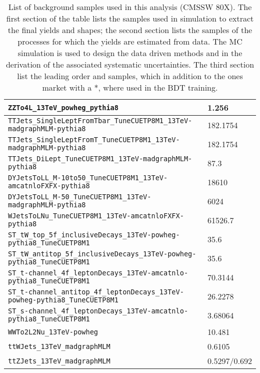 \begin{table}
\begin{tabular}{ll}
    \verb|ZZTo4L_13TeV_powheg_pythia8|                                              & 1.256 \\ \hline
    \verb|TTJets_SingleLeptFromTbar_TuneCUETP8M1_13TeV-madgraphMLM-pythia8|         & 182.1754 \quad * \\
    \verb|TTJets_SingleLeptFromT_TuneCUETP8M1_13TeV-madgraphMLM-pythia8|            & 182.1754 \quad * \\
    \verb|TTJets_DiLept_TuneCUETP8M1_13TeV-madgraphMLM-pythia8|                     & 87.3 \quad\quad\quad * \\
    \verb|DYJetsToLL_M-10to50_TuneCUETP8M1_13TeV-amcatnloFXFX-pythia8|              & 18610 \\
    \verb|DYJetsToLL_M-50_TuneCUETP8M1_13TeV-madgraphMLM-pythia8|                   & 6024 \\
    \verb|WJetsToLNu_TuneCUETP8M1_13TeV-amcatnloFXFX-pythia8|                       & 61526.7 \\
    \verb|ST_tW_top_5f_inclusiveDecays_13TeV-powheg-pythia8_TuneCUETP8M1|           & 35.6 \\
    \verb|ST_tW_antitop_5f_inclusiveDecays_13TeV-powheg-pythia8_TuneCUETP8M1|       & 35.6 \\
    \verb|ST_t-channel_4f_leptonDecays_13TeV-amcatnlo-pythia8_TuneCUETP8M1|         & 70.3144\\
    \verb|ST_t-channel_antitop_4f_leptonDecays_13TeV-powheg-pythia8_TuneCUETP8M1|   & 26.2278\\
    \verb|ST_s-channel_4f_leptonDecays_13TeV-amcatnlo-pythia8_TuneCUETP8M1|         & 3.68064 \\
    \verb|WWTo2L2Nu_13TeV-powheg|                                                   & 10.481 \\\hline
    \verb|ttWJets_13TeV_madgraphMLM|                                                & 0.6105 \\
    \verb|ttZJets_13TeV_madgraphMLM|                                                & 0.5297/0.692 \\\hline
    
  \end{tabular}
  \caption[List of background samples used in this analysis (CMSSW 80X).]{List of background samples used in this analysis (CMSSW 80X). The first section of the table lists the samples used in simulation to extract the final yields and shapes; the second section lists the samples of the processes for which the yields are estimated from data. The MC simulation is used to design the data driven methods and in the derivation of the associated systematic uncertainties. The third section list the leading order \ttW and \ttZ samples, which in addition to the ones market with a *, where used in the BDT training.} \label{tab:bgsamples}
\end{table}
